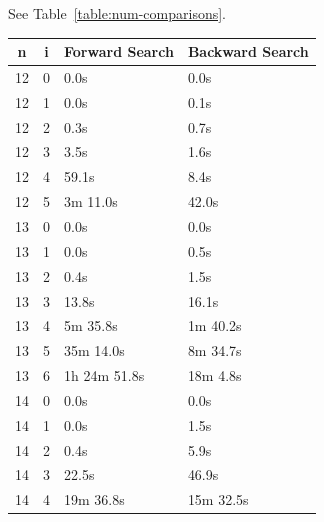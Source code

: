 \documentclass[10pt,journal,compsoc]{IEEEtran}
\begin{document}
See Table~\ref{table:num-comparisons}.


\begin{table}[htbp]
  \begin{tabular}{c|c|l|l}
    \textbf{n} & \textbf{i} & \textbf{Forward Search } & \textbf{Backward Search } \\ \hline
    12         & 0          & 0.0s                     & 0.0s                      \\
    12         & 1          & 0.0s                     & 0.1s                      \\
    12         & 2          & 0.3s                     & 0.7s                      \\
    12         & 3          & 3.5s                     & 1.6s                      \\
    12         & 4          & 59.1s                    & 8.4s                      \\
    12         & 5          & 3m 11.0s                 & 42.0s                     \\
    \hline
    13         & 0          & 0.0s                     & 0.0s                      \\
    13         & 1          & 0.0s                     & 0.5s                      \\
    13         & 2          & 0.4s                     & 1.5s                      \\
    13         & 3          & 13.8s                    & 16.1s                     \\
    13         & 4          & 5m 35.8s                 & 1m 40.2s                  \\
    13         & 5          & 35m 14.0s                & 8m 34.7s                  \\
    13         & 6          & 1h 24m 51.8s             & 18m 4.8s                  \\
    \hline
    14         & 0          & 0.0s                     & 0.0s                      \\
    14         & 1          & 0.0s                     & 1.5s                      \\
    14         & 2          & 0.4s                     & 5.9s                      \\
    14         & 3          & 22.5s                    & 46.9s                     \\
    14         & 4          & 19m 36.8s                & 15m 32.5s                 \\

\end{tabular}
\end{table}
\end{document}
